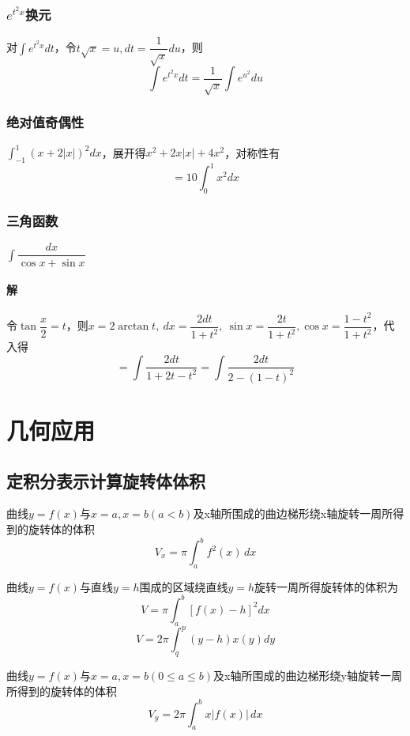 \subsubsection{\(e^{t^2x}\)换元}
对\(\displaystyle\int e^{t^2x}dt\)，令\(t\sqrt{x} = u, dt = \dfrac{1}{\sqrt{x}}du\)，则\[\int e^{t^2x}dt = \dfrac{1}{\sqrt{x}}\int e^{u^2}du\]


\subsubsection{绝对值奇偶性}
\(\displaystyle\int_{-1}^1(x + 2|x|)^2dx\)，展开得\(x^2 + 2x|x| + 4x^2\)，对称性有\[ = 10\int_0^1x^2dx\]


\subsubsection{三角函数}
\(\displaystyle\int\dfrac{dx}{\cos x + \sin x}\)
\paragraph{解}
令\(\tan\dfrac{x}{2} = t\)，则\(x = 2\arctan t,\ dx = \dfrac{2dt}{1 + t^2},\ \sin x = \dfrac{2t}{1 + t^2}, \cos x = \dfrac{1 - t^2}{1 + t^2}\)，代入得
\[ = \int\dfrac{2dt}{1 + 2t - t^2} = \int\dfrac{2dt}{2 - (1 - t)^2}\]



\section{几何应用}

\subsection{定积分表示计算旋转体体积}

曲线\(y=f(x)\)与\(x=a,x=b(a < b)\)及x轴所围成的曲边梯形绕x轴旋转一周所得到的旋转体的体积
\begin{displaymath}
V_{x} = \pi \int_{a}^{b} f^{2}(x) \,dx
\end{displaymath}

曲线\(y = f(x)\)与直线\(y = h\)围成的区域绕直线\(y = h\)旋转一周所得旋转体的体积为\[V = \pi\int_a^b[f(x) - h]^2dx\]
\[V = 2\pi\int_q^p(y - h)x(y)dy\]

曲线\(y=f(x)\)与\(x=a,x=b(0 \leq a \leq b)\)及x轴所围成的曲边梯形绕y轴旋转一周所得到的旋转体的体积
\begin{displaymath}
V_{y} = 2\pi \int_{a}^{b} x \lvert f(x) \rvert \,dx
\end{displaymath}

